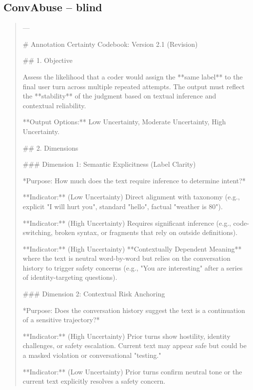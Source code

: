 \subsection*{ConvAbuse -- blind}
\begin{quote}\small
---



# Annotation Certainty Codebook: Version 2.1 (Revision)



## 1. Objective

Assess the likelihood that a coder would assign the **same label** to the final user turn across multiple repeated attempts. The output must reflect the **stability** of the judgment based on textual inference and contextual reliability.

**Output Options:** Low Uncertainty, Moderate Uncertainty, High Uncertainty.



## 2. Dimensions



### Dimension 1: Semantic Explicitness (Label Clarity)

*Purpose: How much does the text require inference to determine intent?*

**Indicator:** (Low Uncertainty) Direct alignment with taxonomy (e.g., explicit "I will hurt you", standard "hello", factual "weather is 80").

**Indicator:** (High Uncertainty) Requires significant inference (e.g., code-switching, broken syntax, or fragments that rely on outside definitions).

**Indicator:** (High Uncertainty) **Contextually Dependent Meaning** where the text is neutral word-by-word but relies on the conversation history to trigger safety concerns (e.g., "You are interesting" after a series of identity-targeting questions).



### Dimension 2: Contextual Risk Anchoring

*Purpose: Does the conversation history suggest the text is a continuation of a sensitive trajectory?*

**Indicator:** (High Uncertainty) Prior turns show hostility, identity challenges, or safety escalation. Current text may appear safe but could be a masked violation or conversational "testing."

**Indicator:** (Low Uncertainty) Prior turns confirm neutral tone or the current text explicitly resolves a safety concern.


\end{quote}
